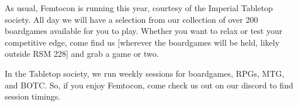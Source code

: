 

\begingroup
\setlength{\parskip}{7pt}  
As usual, Femtocon is running this year, courtesy of the Imperial Tabletop society. All day we will have a selection from our collection of over 200 boardgames available for you to play. Whether you want to relax or test your competitive edge, come find us [wherever the boardgames will be held, likely outside RSM 228] and grab a game or two.

In the Tabletop society, we run weekly sessions for boardgames, RPGs, MTG, and BOTC. So, if you enjoy Femtocon, come check us out on our discord to find session timings.
\endgroup
